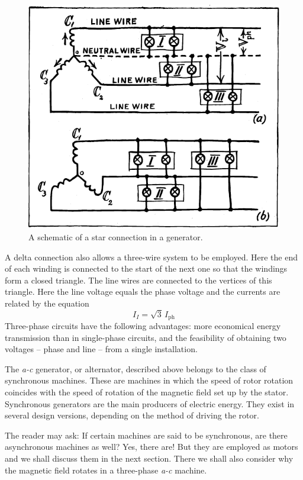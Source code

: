 \begin{figure}[!ht]
\centering
\includegraphics[width=\textwidth]{figures/fig-04-07.pdf}
\caption{A schematic of a star connection in a generator.}
\label{fig-4.7}
\end{figure}

A delta connection also allows a three-wire system to be employed. Here the end of each winding is connected to the start of the next one so that the windings form a closed triangle. The line wires are connected to the vertices of this triangle. Here the line voltage equals the phase voltage and the currents are related by the equation
\begin{equation*}%
I_{I} = \sqrt{3} \, I_{\textrm{ph}}
\end{equation*}
Three-phase circuits have the following advantages: more economical energy transmission than in single-phase circuits, and the feasibility of obtaining two voltages -- phase and line -- from a single installation.


The \emph{a-c} generator, or alternator, described above belongs to the class of synchronous machines. These are machines in which the speed of rotor rotation coincides with the speed of rotation of the magnetic field set up by the stator. Synchronous generators are the main producers of electric energy. They exist in several design versions, depending on the method of driving the rotor.

The reader may ask: If certain machines are said to be synchronous, are there asynchronous machines as well? Yes, there are! But they are employed as motors and we shall discuss them in the next section. There we shall also consider why the magnetic field rotates in a three-phase \emph{a-c} machine.

